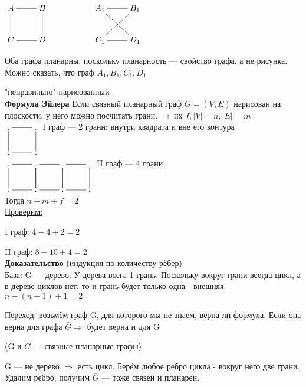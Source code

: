 \documentclass[a4paper, 12pt] {article}
\begin{document}
$\xymatrix{
	A \ar@{-}[r]  & B \ar@{-}[d]  & & A_{1} \ar@{-}[r] \ar@{-}[rd] & B_{1}  \ar@{-}[ld]\\
	C \ar@{-}[u] \ar@{-}[r]  & D & & C_{1}  \ar@{-}[r]  & D_{1}\\ 
}$

Оба графа планарны, поскольку планарность --- свойство графа, а не рисунка. Можно сказать, что граф $A_{1}, B_{1}, C_{1}, D_{1}$ 

"неправильно"$  $ нарисованный\\


\textbf{Формула Эйлера} Если связный планарный граф $G = (V, E)$ нарисован на плоскости, у него можно посчитать грани. $ \sqsupset $ их $ f, |V|=n, |E|=m $\\


$\xymatrix{
	. \ar@{-}[r] & . \ar@{-}[d] \\
	. \ar@{-}[u] \ar@{-}[r]  & . \\ 
}$ I граф --- 2 грани: внутри квадрата и вне его контура\\


$\xymatrix{
	. \ar@{-}[r] & . \ar@{-}[d]  . \ar@{-}[r] & . \ar@{-}[d]   . \ar@{-}[r] & . \ar@{-}[d] \\
	. \ar@{-}[u] \ar@{-}[r]  & .   \ar@{-}[u] \ar@{-}[r]  & .   \ar@{-}[u] \ar@{-}[r]  & . \\
}$ II граф --- 4 грани\\

Тогда $ n-m+f=2 $\\

\underline{Проверим:}

I граф: $4-4+2=2$

II граф: $8-10+4=2$\\

\newpage
\textbf{Доказательство} (индукция по количеству рёбер)\\

База: G --- дерево. У дерева всега 1 грань. Поскольку вокруг грани всегда цикл, а в дереве циклов нет, то и грань будет только одна - внешняя: $ n-(n-1)+1=2 $

Переход: возьмём граф G, для которого мы не знаем, верна ли формула. Если она верна для графа $ \bar G \Rightarrow $ будет верна и для G

(G и $ \bar G $ --- связные планарные графы)

G --- не дерево $ \Rightarrow $ есть цикл. Берём любое ребро цикла - вокруг него две грани. Удалим ребро, получим $ \bar G $ --- тоже связен и планарен.
\end{document}
